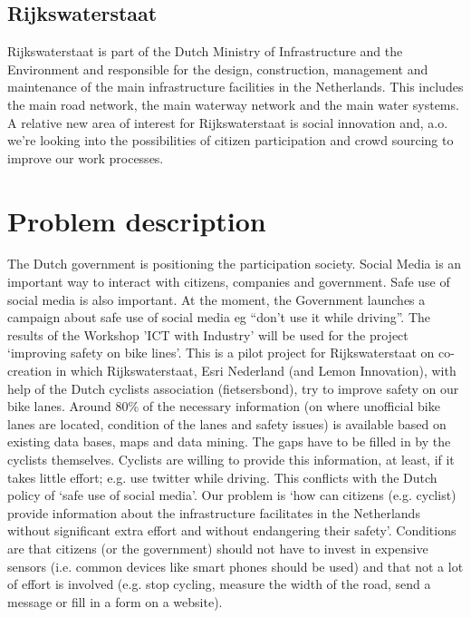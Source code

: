 \documentclass[a4paper,11pt]{article}
\begin{document}
\subsection*{Rijkswaterstaat}

Rijkswaterstaat is part of the Dutch Ministry of Infrastructure and the Environment and responsible for the design, construction, management and maintenance of the main infrastructure facilities in the Netherlands. This includes the main road network, the main waterway network and the main water systems.
A relative new area of interest for Rijkswaterstaat is social innovation and, a.o. we're looking into the possibilities of citizen participation and crowd sourcing to improve our work processes.

\section{Problem description}

The Dutch government is positioning the participation society. Social Media is an important way to interact with citizens, companies and government. Safe use of social media is also important. At the moment, the Government launches a campaign about safe use of social media eg ``don't use it while driving''.
The results of the Workshop 'ICT with Industry' will be used for the project `improving safety on bike lines'. This is a pilot project for Rijkswaterstaat on co-creation in which Rijkswaterstaat, Esri Nederland (and Lemon Innovation), with help of the Dutch cyclists association (fietsersbond), try to improve safety on our bike lanes. Around 80\% of the necessary information (on where unofficial bike lanes are located, condition of the lanes and safety issues) is available based on existing data bases, maps and data mining. The gaps have to be filled in by the cyclists themselves. Cyclists are willing to provide this information, at least, if it takes little effort; e.g. use twitter while driving. This conflicts with the Dutch policy of `safe use of social media'.
Our problem is `how can citizens (e.g. cyclist) provide information about the infrastructure facilitates in the Netherlands without significant extra effort and without endangering their safety'.
Conditions are that citizens (or the government) should not have to invest in expensive sensors (i.e. common devices like smart phones should be used) and that not a lot of effort is involved (e.g. stop cycling, measure the width of the road, send a message or fill in a form on a website).
\end{document}
